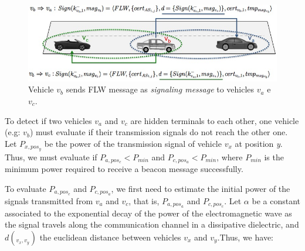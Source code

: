 \documentclass[preprint,12pt]{elsarticle}
\begin{document}
\begin{figure}[ht]
\centering
\includegraphics[scale=.38]{figures/signiling-message-scenario.jpg}
\caption{Vehicle $v_{b}$ sends FLW message as \textit{signaling message} to vehicles $v_{a}$ e $v_{c}$.}
\label{fig:first-level-signaling-message}
\end{figure}

To detect if two vehicles $v_a$ and $v_c$ are hidden terminals to each other, one vehicle (e.g: $v_b$) must evaluate if their transmission signals do not reach the other one. Let $P_{x, pos_y}$ be the power of the transmission signal of vehicle $v_x$ at position \textit{y}. Thus, we must evaluate if $P_{a, pos_c} < P_{min}$ and $P_{c, pos_a} < P_{min}$, where $P_{min}$ is the minimum power required to receive a beacon message successfully.

To evaluate $P_{a, pos_c}$ and $P_{c, pos_a}$, we first need to estimate the initial power of the signals transmitted from $v_a$ and $v_c$, that is, $P_{a, pos_a}$ and $P_{c, pos_c}$. Let $\alpha$ be a constant associated to the exponential decay of the power of the electromagnetic wave as the signal travels along the communication channel in a dissipative dielectric, and $d(_{v_x, v_y})$ the euclidean distance between vehicles $v_x$ and $v_y$.Thus, we have:


%
\end{document}
